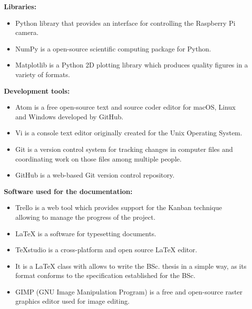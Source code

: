 \documentclass{pre-tfg}
\begin{document}
\textbf{Libraries:}
\begin{itemize}
	\item {} Python library that provides an interface for controlling the Raspberry Pi camera.
	
	\item {} NumPy is a open-source scientific computing package for Python.
	
	\item {} Matplotlib is a Python 2D plotting library which produces quality figures in a variety of formats.
	
\end{itemize}

\textbf{Development tools:}
\begin{itemize}
	\item {} Atom is a free open-source text and source coder editor for macOS, Linux and Windows developed by GitHub.
	
	\item {} Vi is a console text editor originally created for the Unix  Operating System. 
	
	\item {} Git is a version control system for tracking changes in computer files and coordinating work on those files among multiple people.
	
	\item {} GitHub is a web-based Git version control repository.
	
	
	
\end{itemize}

\textbf{Software used for the documentation:}
\begin{itemize}
	\item {} Trello is a web tool which provides support for the Kanban technique allowing to manage the progress of the project.
	
	\item {} \LaTeX{} is a software for typesetting documents.
	
	\item {} TeXstudio is a cross-platform and open source \LaTeX{} editor.
	
	\item {} It is a \LaTeX{} class with allows to write the BSc. thesis in a simple way, as its format conforms to the specification established for the BSc.
	
	\item {} GIMP (GNU Image Manipulation Program) is a free and open-source raster graphics editor used for image editing.
	
	
\end{itemize}


%

\singlespacing

\end{document}
